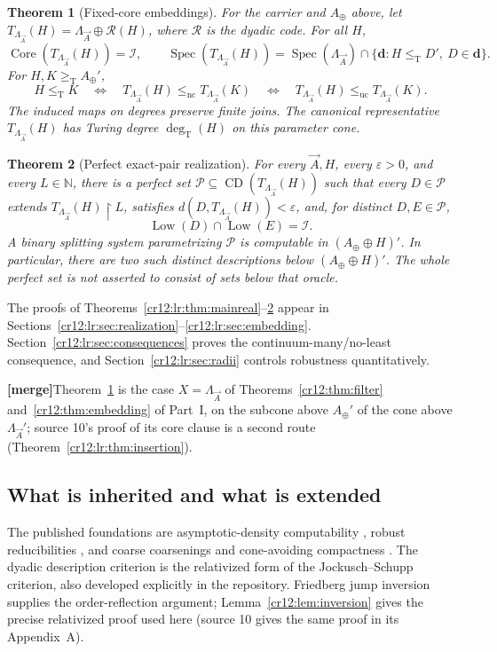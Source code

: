 \documentclass[11pt,letterpaper]{article}
\theoremstyle{plain}
\newtheorem{theorem}{Theorem}[section]
\theoremstyle{definition}
\theoremstyle{remark}
\numberwithin{equation}{section}
\newcommand{\N}{\mathbb N}
\newcommand{\leT}{\leq_{\mathrm T}}
\newcommand{\geT}{\geq_{\mathrm T}}
\newcommand{\leuc}{\leq_{\mathrm{uc}}}
\newcommand{\lenc}{\leq_{\mathrm{nc}}}
\newcommand{\Core}{\operatorname{Core}}
\newcommand{\CD}{\operatorname{CD}}
\newcommand{\Low}{\operatorname{Low}}
\newcommand{\Spec}{\operatorname{Spec}}
\newcommand{\degT}{\deg_{\mathrm T}}
\newcommand{\Rcode}{\mathcal R}
\newcommand{\rest}{\mathbin{\upharpoonright}}
\newcommand{\I}{\mathcal I}
\newcommand{\mergenote}[1]{\par\smallskip\noindent
 {\small\textsf{\textbf{[merge]}}\enspace #1}\par\smallskip}
\newcommand{\Aplus}{A_{\oplus}}          %
\newcommand{\Lam}{\Lambda_{\vec A}}      %
\begin{document}
\begin{theorem}[Fixed-core embeddings]\label{cr12:lr:thm:mainembed}
For the carrier and $\Aplus$ above, let $T_{\Lam}(H)=\Lam\oplus\Rcode(H)$, where $\Rcode$
is the dyadic code. For all $H$,
\[
 \Core(T_{\Lam}(H))=\I,\qquad
 \Spec(T_{\Lam}(H))=\Spec(\Lam)\cap\{\mathbf d:H\leT D',\ D\in\mathbf d\}.
\]
For $H,K\geT \Aplus'$,
\begin{equation}\label{cr12:lr:eq:introembed}
 H\leT K\quad\Longleftrightarrow\quad
 T_{\Lam}(H)\lenc T_{\Lam}(K)
 \quad\Longleftrightarrow\quad
 T_{\Lam}(H)\leuc T_{\Lam}(K).
\end{equation}
The induced maps on degrees preserve finite joins. The canonical representative
$T_{\Lam}(H)$ has Turing degree $\degT(H)$ on this parameter cone.
\end{theorem}

\begin{theorem}[Perfect exact-pair realization]\label{cr12:lr:thm:mainperfect}
For every $\vec A,H$, every $\varepsilon>0$, and every $L\in\N$, there is a perfect set
$\mathcal P\subseteq\CD(T_{\Lam}(H))$ such that every $D\in\mathcal P$ extends
$T_{\Lam}(H)\rest L$, satisfies $d(D,T_{\Lam}(H))<\varepsilon$, and, for distinct
$D,E\in\mathcal P$,
\[
 \Low(D)\cap\Low(E)=\I.
\]
A binary splitting system parametrizing $\mathcal P$ is computable in
$(\Aplus\oplus H)'$. In particular, there are two such distinct descriptions below
$(\Aplus\oplus H)'$. The whole perfect set is not asserted to consist of sets below
that oracle.
\end{theorem}

The proofs of Theorems~\ref{cr12:lr:thm:mainreal}--\ref{cr12:lr:thm:mainperfect} appear
in Sections~\ref{cr12:lr:sec:realization}--\ref{cr12:lr:sec:embedding}.
Section~\ref{cr12:lr:sec:consequences} proves the continuum-many/no-least consequence,
and Section~\ref{cr12:lr:sec:radii} controls robustness quantitatively.

\mergenote{Theorem~\ref{cr12:lr:thm:mainembed} is the case $X=\Lam$ of
Theorems~\ref{cr12:thm:filter} and~\ref{cr12:thm:embedding} of Part~I, on the subcone
above $\Aplus'$ of the cone above $\Lam'$; source 10's proof of its core clause is a
second route (Theorem~\ref{cr12:lr:thm:insertion}).}

\subsection{What is inherited and what is extended}
The published foundations are asymptotic-density computability \cite{JS}, robust
reducibilities \cite{DI}, and coarse coarsenings and cone-avoiding compactness
\cite{HJKS}. The dyadic description criterion is the relativized form of the
Jockusch--Schupp criterion, also developed explicitly in the repository. Friedberg
jump inversion \cite{Friedberg} supplies the order-reflection argument;
Lemma~\ref{cr12:lem:inversion} gives the precise relativized proof used here (source 10
gives the same proof in its Appendix~A).
\end{document}
